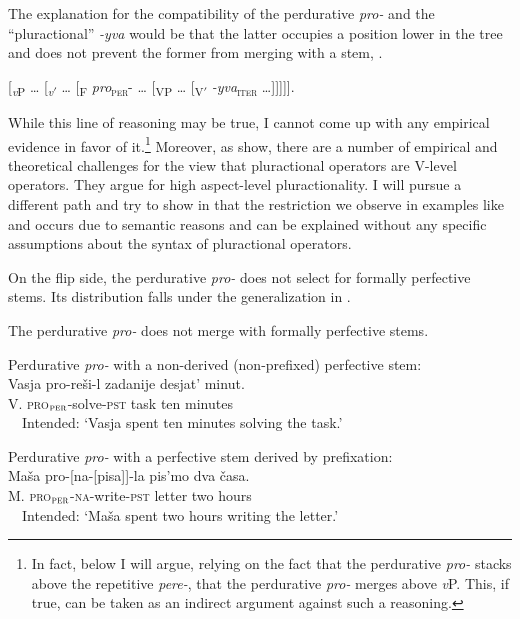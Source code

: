 \documentclass[output=paper,
]{langscibook}
\begin{document}
\noindent The explanation for the compatibility of the perdurative \textit{pro-} and the ``pluractional''
\textit{-yva} would be that the latter occupies a position lower in the tree and does not prevent the former from merging with a stem, .

\ea \label{ex:naumov:11}
{[\textsubscript{\textit{v}P} {\ldots} [\textsubscript{\textit{v}$'$} {\ldots} [\textsubscript{F} \textit{pro}\textsubscript{\textsc{per}}- {\ldots} [\textsubscript{VP} {\ldots} [\textsubscript{V$'$} \textit{-yva}\textsubscript{\textsc{iter}}  {\ldots}]]]]].}
\z

\noindent While this line of reasoning may be true, I cannot come up with any empirical evidence in favor of it.\footnote{In fact, below I will argue, relying on the fact that the perdurative \textit{pro-} stacks above the repetitive \textit{pere-}, that the perdurative \textit{pro-} merges above \textit{v}P. This, if true, can be taken as an indirect argument against such a reasoning.} Moreover, as \citet{gianina2015pluractionality} show, there are a number of empirical and theoretical challenges for the view that pluractional operators are V-level operators. They argue for high aspect-level pluractionality. I will pursue a different path and try to show in  that the restriction we observe in examples like  and  occurs due to semantic reasons and can be explained without any specific assumptions about the syntax of pluractional operators.

On the flip side, the perdurative \textit{pro-} does not select for formally perfective stems. Its distribution falls under the generalization in . 

\ea \label{ex:naumov:12}
The perdurative \textit{pro-} does not merge with formally perfective stems.
\z

    \ea Perdurative \textit{pro-} with a non-derived (non-prefixed) perfective stem:\label{ex:naumov:13}\smallskip\\
    \gll * Vasja		pro-reši-l			zadanije	desjat’		minut.\\
    {} V.		\textsc{pro}$_\textsc{per}$-solve-\textsc{pst}		task		ten		minutes
    \\
    \glt \ \ Intended: `Vasja spent ten minutes solving the task.'
    \z

    \ea Perdurative \textit{pro-} with a perfective stem derived by prefixation:\label{ex:naumov:14}\smallskip\\
    \gll * Maša	pro-[na-[pisa]]-la		pis’mo		dva	časa.\\
    {} M.	\textsc{pro}$_\textsc{per}$-\textsc{na}-write-\textsc{pst}	letter		two	hours\\
    \glt \ \ Intended: `Maša spent two hours writing the letter.'
    \z
\end{document}
